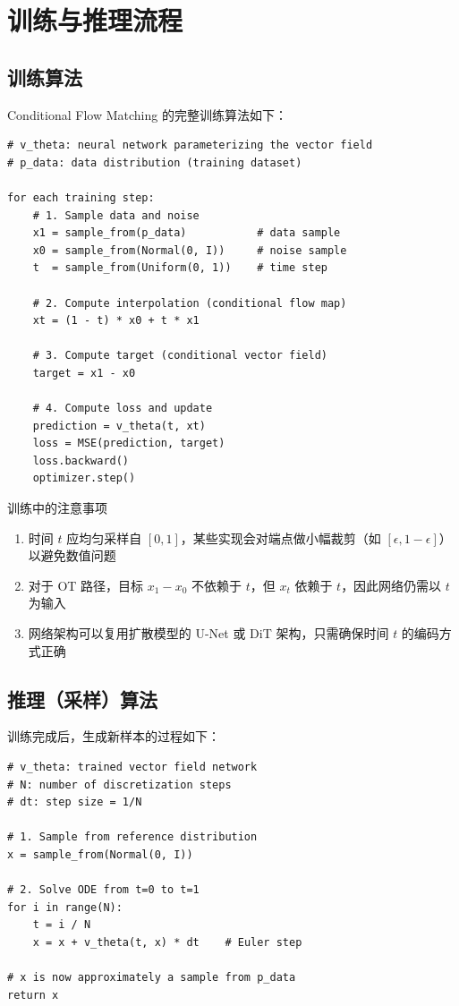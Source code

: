 \section{训练与推理流程}

\subsection{训练算法}

Conditional Flow Matching 的完整训练算法如下：

\begin{lstlisting}[caption={Conditional Flow Matching 训练算法（OT 路径）}]
# v_theta: neural network parameterizing the vector field
# p_data: data distribution (training dataset)

for each training step:
    # 1. Sample data and noise
    x1 = sample_from(p_data)           # data sample
    x0 = sample_from(Normal(0, I))     # noise sample
    t  = sample_from(Uniform(0, 1))    # time step

    # 2. Compute interpolation (conditional flow map)
    xt = (1 - t) * x0 + t * x1

    # 3. Compute target (conditional vector field)
    target = x1 - x0

    # 4. Compute loss and update
    prediction = v_theta(t, xt)
    loss = MSE(prediction, target)
    loss.backward()
    optimizer.step()
\end{lstlisting}

\begin{warningbox}{训练中的注意事项}
\begin{enumerate}
    \item 时间 $t$ 应均匀采样自 $[0, 1]$，某些实现会对端点做小幅裁剪（如 $[\epsilon, 1-\epsilon]$）以避免数值问题
    \item 对于 OT 路径，目标 $x_1 - x_0$ 不依赖于 $t$，但 $x_t$ 依赖于 $t$，因此网络仍需以 $t$ 为输入
    \item 网络架构可以复用扩散模型的 U-Net 或 DiT 架构，只需确保时间 $t$ 的编码方式正确
\end{enumerate}
\end{warningbox}

\subsection{推理（采样）算法}

训练完成后，生成新样本的过程如下：

\begin{lstlisting}[caption={Flow Matching 采样算法（Euler 方法）}]
# v_theta: trained vector field network
# N: number of discretization steps
# dt: step size = 1/N

# 1. Sample from reference distribution
x = sample_from(Normal(0, I))

# 2. Solve ODE from t=0 to t=1
for i in range(N):
    t = i / N
    x = x + v_theta(t, x) * dt    # Euler step

# x is now approximately a sample from p_data
return x
\end{lstlisting}

